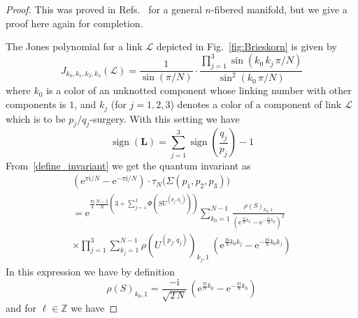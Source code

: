 \documentclass[12pt,reqno]{amsart}
\numberwithin{equation}{section}
\DeclareMathOperator{\sign}{sign}
\begin{document}
\begin{proof}
  This was proved in Refs.~ for
  a general $n$-fibered manifold,
  but we  give a proof here again for 
  completion.

  The Jones polynomial for a link $\mathcal{L}$ depicted in
  Fig.~\ref{fig:Brieskorn} is given by
  \begin{equation*}
    J_{k_0, k_1,k_2,k_3}(\mathcal{L})
    =
    \frac{1}{\sin (\pi/N)} \cdot
    \frac{
      \prod_{j=1}^3
      \sin
      \left( k_0 \, k_j \, \pi/N \right)
    }{
      \sin^2 \left(
        k_0 \, \pi / N
      \right)
    }
  \end{equation*}
  where
  $k_0$ is a color  of an unknotted component whose linking number with other components
  is $1$, and
  $k_j$ (for $j=1,2,3$) denotes a color of a
  component of link $\mathcal{L}$
  which is to be $p_j/q_j$-surgery.
  With this setting we have
  \begin{equation*}
    \sign(\mathbf{L})
    = 
    \sum_{j=1}^3 \sign \left(\frac{q_j}{p_j}\right)
    -1 
  \end{equation*}
  {}From~\eqref{define_invariant}  we get the quantum invariant as
  \begin{multline*}
    \left(
      \mathrm{e}^{\pi \mathrm{i}/N}
      -
      \mathrm{e}^{- \pi \mathrm{i}/N}
    \right) \cdot
    \tau_N \bigl(
    \Sigma(p_1, p_2, p_3)
    \bigr)
    \\
    =
    \mathrm{e}^{
      \frac{\pi \mathrm{i}}{4} \frac{N-2}{N}
      \left(
        3  + \sum_{j=1}^3 \Phi(S U^{(p_j,q_j)})
      \right)
    }
    \sum_{k_0=1}^{N-1}
    \frac{
      \rho(S)_{k_0,1}
    }{
      \left(
        \mathrm{e}^{\frac{\pi \mathrm{i}}{N} k_0}
        -
        \mathrm{e}^{- \frac{\pi \mathrm{i}}{N} k_0}
      \right)^2
    } \,
    \\
    \times
    \prod_{j=1}^3 \sum_{k_j=1}^{N-1}
    \rho(U^{(p_j,q_j)})_{k_j,1} \,
    \left(
      \mathrm{e}^{\frac{\pi \mathrm{i}}{N} k_0 k_j}
      -
      \mathrm{e}^{ -\frac{\pi \mathrm{i}}{N} k_0 k_j}
    \right)
  \end{multline*}
  In this expression we have by definition
  \begin{equation*}
    \rho(S)_{k_0,1}
    =
    \frac{- \mathrm{i}}{\sqrt{2 \, N}} \,
    \left(
      \mathrm{e}^{\frac{\pi \mathrm{i}}{N} k_0}
      -
      \mathrm{e}^{-\frac{\pi \mathrm{i}}{N} k_0}
    \right)
  \end{equation*}
  and for $\ell \in \mathbb{Z}$ we have

\end{proof}
\end{document}
